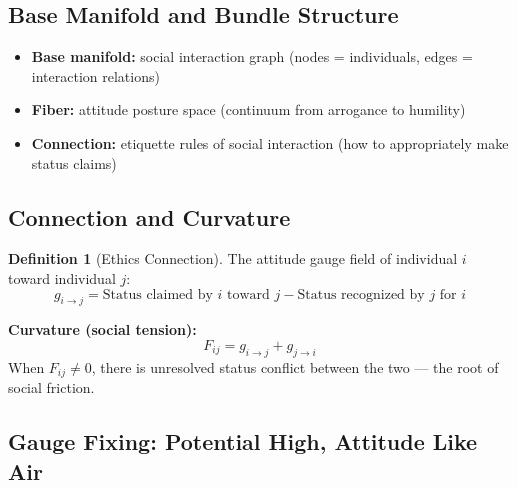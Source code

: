 \documentclass[12pt,a4paper]{article}
\theoremstyle{plain}
\theoremstyle{definition}
\newtheorem{definition}[theorem]{Definition}
\begin{document}
\subsection{Base Manifold and Bundle Structure}

\begin{itemize}
    \item \textbf{Base manifold:} social interaction graph (nodes = individuals, edges = interaction relations)
    \item \textbf{Fiber:} attitude posture space (continuum from arrogance to humility)
    \item \textbf{Connection:} etiquette rules of social interaction (how to appropriately make status claims)
\end{itemize}

\subsection{Connection and Curvature}

\begin{definition}[Ethics Connection]
The attitude gauge field of individual $i$ toward individual $j$:
\begin{equation}
    g_{i \to j} = \text{Status claimed by $i$ toward $j$} - \text{Status recognized by $j$ for $i$}
\end{equation}

\textbf{Curvature (social tension):}
\begin{equation}
    F_{ij} = g_{i \to j} + g_{j \to i}
\end{equation}
When $F_{ij} \neq 0$, there is unresolved status conflict between the two — the root of social friction.
\end{definition}

\subsection{Gauge Fixing: Potential High, Attitude Like Air}
\end{document}
